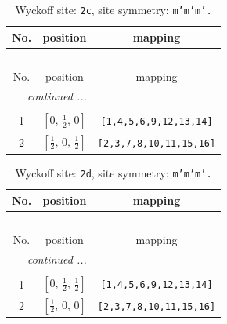 \documentclass[fleqn,8pt]{jsarticle}
\begin{document}
\renewcommand{\arraystretch}{1.2}
\begin{longtable}{ccc}
\caption{Wyckoff site: {\tt 2c}, site symmetry: {\tt m'm'm'.}}
 \\
 \hline \hline
No. & position & mapping \\ \hline \endfirsthead

\multicolumn{2}{l}{\tablename\ \thetable{}} \\
 \hline \hline
No. & position & mapping \\ \hline \endhead

 \hline \hline
\multicolumn{2}{r}{\footnotesize\it continued ...} \\ \endfoot

 \hline \hline
\multicolumn{2}{r}{} \\ \endlastfoot

1 & $\left[ 0,\, \frac{1}{2},\, 0 \right]$ & {\tt [1,4,5,6,9,12,13,14]} \\ \hline
2 & $\left[ \frac{1}{2},\, 0,\, \frac{1}{2} \right]$ & {\tt [2,3,7,8,10,11,15,16]} \\
\end{longtable}
\renewcommand{\arraystretch}{1.2}
\begin{longtable}{ccc}
\caption{Wyckoff site: {\tt 2d}, site symmetry: {\tt m'm'm'.}}
 \\
 \hline \hline
No. & position & mapping \\ \hline \endfirsthead

\multicolumn{2}{l}{\tablename\ \thetable{}} \\
 \hline \hline
No. & position & mapping \\ \hline \endhead

 \hline \hline
\multicolumn{2}{r}{\footnotesize\it continued ...} \\ \endfoot

 \hline \hline
\multicolumn{2}{r}{} \\ \endlastfoot

1 & $\left[ 0,\, \frac{1}{2},\, \frac{1}{2} \right]$ & {\tt [1,4,5,6,9,12,13,14]} \\ \hline
2 & $\left[ \frac{1}{2},\, 0,\, 0 \right]$ & {\tt [2,3,7,8,10,11,15,16]} \\
\end{longtable}
\renewcommand{\arraystretch}{1.2}
\end{document}
